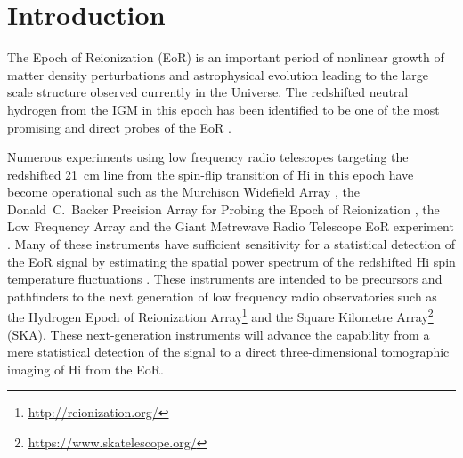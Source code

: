 \documentclass[preprint2,iop,numberedappendix,twocolappendix,appendixfloats]{emulateapj}
\begin{document}

\section{Introduction}\label{intro}


The Epoch of Reionization (EoR) is an important period of nonlinear growth of matter density perturbations and astrophysical evolution leading to the large scale structure observed currently in the Universe. The redshifted neutral hydrogen from the IGM in this epoch has been identified to be one of the most promising and direct probes of the EoR \citep{sun72,sco90,mad97,toz00,ili02}. 

Numerous experiments using low frequency radio telescopes targeting the redshifted 21~cm line from the spin-flip transition of H{\sc i} in this epoch have become operational such as the Murchison Widefield Array \citep[MWA;][]{lon09,bow13,tin13}, the Donald~C.~Backer Precision Array for Probing the Epoch of Reionization \citep[PAPER;][]{par10}, the Low Frequency Array \citep[LOFAR;][]{van13} and the Giant Metrewave Radio Telescope EoR experiment \citep[GMRT;][]{pac13}. Many of these instruments have sufficient sensitivity for a statistical detection of the EoR signal by estimating the spatial power spectrum of the redshifted H{\sc i} spin temperature fluctuations \citep{bea13,thy13}. These instruments are intended to be precursors and pathfinders to the next generation of low frequency radio observatories such as the Hydrogen Epoch of Reionization Array\footnote{\url{http://reionization.org/}} \citep[HERA;][]{deb16} and the Square Kilometre Array\footnote{\url{https://www.skatelescope.org/}} (SKA). These next-generation instruments will advance the capability from a mere statistical detection of the signal to a direct three-dimensional tomographic imaging of H{\sc i} from the EoR. 
\end{document}
